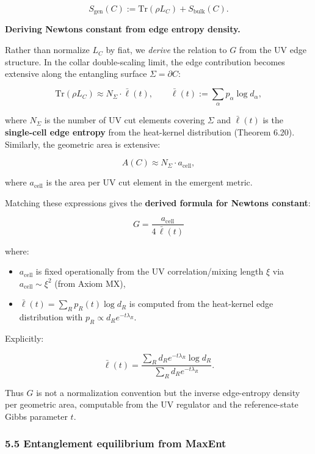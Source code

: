 \[
S_{\mathrm{gen}}(C) := \mathrm{Tr}(\rho L_C) + S_{\mathrm{bulk}}(C).
\]

\textbf{Deriving Newton\textquotesingle s constant from edge entropy density.}

Rather than normalize \(L_C\) by fiat, we \emph{derive} the relation to \(G\) from the UV edge structure. In the collar double-scaling limit, the edge contribution becomes extensive along the entangling surface \(\Sigma = \partial C\):

\[
\mathrm{Tr}(\rho L_C) \approx N_\Sigma \cdot \bar{\ell}(t),
\qquad
\bar{\ell}(t) := \sum_\alpha p_\alpha \log d_\alpha,
\]

where \(N_\Sigma\) is the number of UV cut elements covering \(\Sigma\) and \(\bar{\ell}(t)\) is the \textbf{single-cell edge entropy} from the heat-kernel distribution (Theorem 6.20). Similarly, the geometric area is extensive:

\[
A(C) \approx N_\Sigma \cdot a_{\mathrm{cell}},
\]

where \(a_{\mathrm{cell}}\) is the area per UV cut element in the emergent metric.

Matching these expressions gives the \textbf{derived formula for Newton\textquotesingle s constant}:

\[
G = \frac{a_{\mathrm{cell}}}{4 \, \bar{\ell}(t)}
\]

where:

\begin{itemize}
\tightlist
\item
  \(a_{\mathrm{cell}}\) is fixed operationally from the UV correlation/mixing length \(\xi\) via \(a_{\mathrm{cell}} \sim \xi^2\) (from Axiom MX),
\item
  \(\bar{\ell}(t) = \sum_R p_R(t) \log d_R\) is computed from the heat-kernel edge distribution with \(p_R \propto d_R e^{-t\lambda_R}\).
\end{itemize}

Explicitly:

\[
\bar{\ell}(t) = \frac{\sum_R d_R e^{-t\lambda_R} \log d_R}{\sum_R d_R e^{-t\lambda_R}}.
\]

Thus \(G\) is not a normalization convention but the inverse edge-entropy density per geometric area, computable from the UV regulator and the reference-state Gibbs parameter \(t\).

\subsubsection{5.5 Entanglement equilibrium from MaxEnt}\label{55-entanglement-equilibrium-from-maxent}

